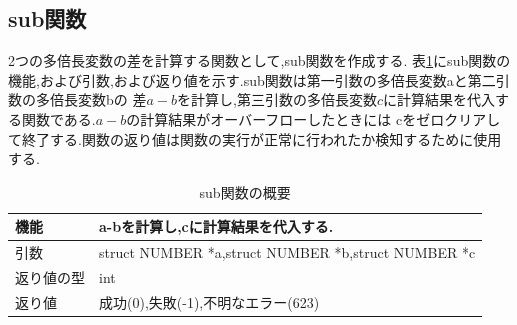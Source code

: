 \documentclass[a4j] {jarticle}
\begin{document}
\subsection{sub関数}
2つの多倍長変数の差を計算する関数として,sub関数を作成する.
表\ref{sub}にsub関数の機能,および引数,および返り値を示す.sub関数は第一引数の多倍長変数aと第二引数の多倍長変数bの
差$a-b$を計算し,第三引数の多倍長変数$c$に計算結果を代入する関数である.$a-b$の計算結果がオーバーフローしたときには
cをゼロクリアして終了する.関数の返り値は関数の実行が正常に行われたか検知するために使用する.
\begin{table}[H]
  \caption{sub関数の概要}
  \label{sub}
  \begin{center}
      \begin{tabular}{|l|l|}\hline
      機能 & a-bを計算し,cに計算結果を代入する.\\ \hline
      引数 & struct NUMBER *a,struct NUMBER *b,struct NUMBER *c\\ \hline
      返り値の型 & int\\ \hline
      返り値 & 成功(0),失敗(-1),不明なエラー(623)\\ \hline
      \end{tabular}
  \end{center}
  \end{table}
\end{document}
